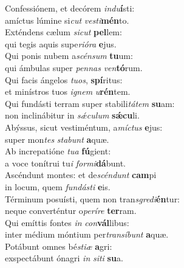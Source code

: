 \evenverse Confessiónem, et decórem \textit{in}\textit{du}\textbf{í}sti:~\*\\
\evenverse amíctus lúmine si\textit{cut} \textit{ve}\textit{sti}\textbf{mén}to.\\
\oddverse Exténdens cælum \textit{si}\textit{cut} \textbf{pel}lem:~\*\\
\oddverse qui tegis aquis supe\textit{ri}\textit{ó}\textit{ra} \textbf{e}jus.\\
\evenverse Qui ponis nubem a\textit{scén}\textit{sum} \textbf{tu}um:~\*\\
\evenverse qui ámbulas super \textit{pen}\textit{nas} \textit{ven}\textbf{tó}rum.\\
\oddverse Qui facis ángelos \textit{tu}\textit{os}, \textbf{spí}ritus:~\*\\
\oddverse et minístros tuos \textit{i}\textit{gnem} \textit{u}\textbf{rén}tem.\\
\evenverse Qui fundásti terram super stabili\textit{tá}\textit{tem} \textbf{su}am:~\*\\
\evenverse non inclinábitur in \textit{sǽ}\textit{cu}\textit{lum} \textbf{sǽ}\textbf{cu}li.\\
\oddverse Abýssus, sicut vestiméntum, a\textit{mí}\textit{ctus} \textbf{e}jus:~\*\\
\oddverse super mon\textit{tes} \textit{sta}\textit{bunt} \textbf{a}quæ.\\
\evenverse Ab increpatióne \textit{tu}\textit{a} \textbf{fú}gient:~\*\\
\evenverse a voce tonítrui tu\textit{i} \textit{for}\textit{mi}\textbf{dá}bunt.\\
\oddverse Ascéndunt montes: et de\textit{scén}\textit{dunt} \textbf{cam}pi~\*\\
\oddverse in locum, quem \textit{fun}\textit{dá}\textit{sti} \textbf{e}is.\\
\evenverse Términum posuísti, quem non tran\textit{sgre}\textit{di}\textbf{én}tur:~\*\\
\evenverse neque converténtur o\textit{pe}\textit{rí}\textit{re} \textbf{ter}ram.\\
\oddverse Qui emíttis fontes \textit{in} \textit{con}\textbf{vál}libus:~\*\\
\oddverse inter médium móntium per\textit{tran}\textit{sí}\textit{bunt} \textbf{a}quæ.\\
\evenverse Potábunt omnes bé\textit{sti}\textit{æ} \textbf{a}gri:~\*\\
\evenverse exspectábunt ónagri \textit{in} \textit{si}\textit{ti} \textbf{su}a.\\
